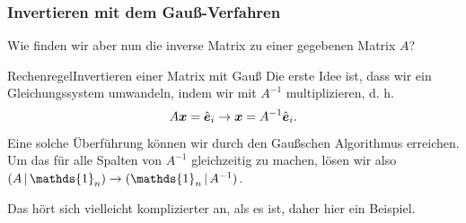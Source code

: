 \subsubsection{Invertieren mit dem Gauß-Verfahren}
Wie finden wir aber nun die inverse Matrix zu einer gegebenen Matrix $A$?
\begin{Satz}
{Rechenregel}{Invertieren einer Matrix mit Gauß}
Die erste Idee ist, dass wir ein Gleichungssystem umwandeln, indem wir mit $A^{-1}$ multiplizieren, d. h.
\begin{equation*}
    A{{\text{\boldmath${x}$}}}=\Hat{{\text{\boldmath${e}$}}}_i\to {{\text{\boldmath${x}$}}}=A^{-1}\Hat{{\text{\boldmath${e}$}}}_i.
\end{equation*}
Eine solche Überführung können wir durch den Gaußschen Algorithmus erreichen.\\
Um das für alle Spalten von $A^{-1}$ gleichzeitig zu machen, lösen wir also $(A\furdas\mathds{1}_n)\to(\mathds{1}_n\furdas A^{-1})$.
\end{Satz}
Das hört sich vielleicht komplizierter an, als es ist, daher hier ein Beispiel.
